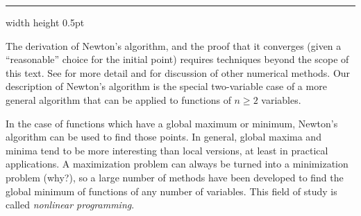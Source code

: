 \hrule width \textwidth height 0.5pt
\medskip

The derivation of Newton's algorithm, and the proof that it converges (given a ``reasonable'' choice for the
initial point) requires techniques beyond the scope of this text. See \cite{rr} for more
detail and for discussion of other numerical methods. Our description of Newton's algorithm is the special
two-variable case of a more general algorithm that can be applied to functions of $n \ge 2$ variables.

In the case of functions which have a global maximum or minimum, 
Newton's algorithm can be used to find those points. 
In general, global maxima and minima tend to be more interesting than local versions, at least in practical applications. 
A maximization problem can always be turned into a minimization problem (why?), so a large number of methods have been developed to find the global minimum of functions of any number of variables. 
This field of study is called \emph{nonlinear programming}. 

